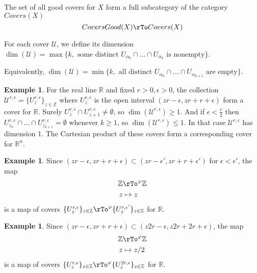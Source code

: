 \documentclass[12pt]{amsart}
\theoremstyle{definition}
\newtheorem{example}[theorem]{Example}
\begin{document}
The set of all good covers for $X$ form a full subcategory of the category $Covers(X)$
$$CoversGood(X) \rTo Covers(X)$$

\dfn For each cover $\mathcal{U}$, we define its dimension $\dim(\mathcal{U}) = \max \{k, \text{ some distinct } U_{\alpha_0} \cap \ldots \cap U_{\alpha_k} \text{ is nonempty}\}$.

Equivalently, $\dim(\mathcal{U}) = \min \{k, \text{ all distinct } U_{\alpha_0} \cap \ldots \cap U_{\alpha_{k+1}} \text{ are empty}\}$.

\begin{example}\label{coverforR} For the real line $\mathbb{R}$ and fixed $r > 0, \epsilon > 0$, the collection $\mathcal{U}^{r, \epsilon} = \{U_z^{r, \epsilon}\}_{z \in \mathbb{Z}}$ where $U_z^{r, \epsilon}$ is the open interval $(zr - \epsilon, zr + r + \epsilon)$ form a cover for $\mathbb{R}$. Surely $U_z^{r, \epsilon} \cap U_{z+1}^{r, \epsilon} \neq \emptyset$, so $\dim(\mathcal{U}^{r, \epsilon}) \geq 1$. And if $\epsilon < \frac{r}{2}$ then $U_{z_0}^{r, \epsilon} \cap \ldots \cap U_{z_{k+1}}^{r, \epsilon} = \emptyset$ whenever $k \geq 1$, so $\dim(\mathcal{U}^{r, \epsilon}) \leq 1$. In that case $\mathcal{U}^{r, \epsilon}$ has dimension 1. The Cartesian product of these covers form a corresponding cover for $\mathbb{R}^n$.
\end{example}

\begin{example}\label{mapofcoversforR1} Since $(zr - \epsilon, zr + r + \epsilon) \subset (zr - \epsilon', zr + r + \epsilon')$ for $\epsilon < \epsilon'$, the map
\begin{align*}
\mathbb{Z} & \rTo^{\varphi} \mathbb{Z} \\
z & \mapsto z
\end{align*}
is a map of covers $\{U_z^{r, \epsilon}\}_{z \in \mathbb{Z}} \rTo^{\varphi} \{U_z^{r, \epsilon'}\}_{z \in \mathbb{Z}}$ for $\mathbb{R}$.
\end{example}

\begin{example}\label{mapofcoversforR2} Since $(zr - \epsilon, zr + r + \epsilon) \subset (z2r - \epsilon, z2r + 2r + \epsilon)$, the map
\begin{align*}
\mathbb{Z} & \rTo^{\varphi} \mathbb{Z} \\
z & \mapsto z/2
\end{align*}
is a map of covers $\{U_z^{r, \epsilon}\}_{z \in \mathbb{Z}} \rTo^{\varphi} \{U_z^{2r, \epsilon}\}_{z \in \mathbb{Z}}$ for $\mathbb{R}$.
\end{example}
\end{document}
